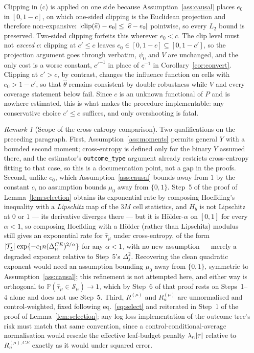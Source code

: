 \documentclass[11pt]{article}
\theoremstyle{plain}
\theoremstyle{definition}
\theoremstyle{remark}
\newtheorem{remark}[theorem]{Remark}
\newcommand{\PP}{\mathbb{P}}
\newcommand{\cT}{\mathcal{T}}
\newcommand{\cS}{\mathcal{S}}
\newcommand{\ez}{e_0}
\newcommand{\mz}{\mu_0}
\newcommand{\ehat}{\widehat{e}}
\newcommand{\that}{\widehat{\tau}}
\newcommand{\thetahat}{\widehat{\theta}}
\DeclarePairedDelimiter{\abs}{\lvert}{\rvert}
\DeclarePairedDelimiter{\card}{\lvert}{\rvert}
\begin{document}
Clipping in (c) is applied on one side
because Assumption~\ref{ass:causal} places $\ez$ in $[0,1-c]$, on which
one-sided clipping is the Euclidean projection and therefore non-expansive:
$\abs{\mathrm{clip}(\ehat)-\ez}\le\abs{\ehat-\ez}$ pointwise, so every $L_2$
bound is preserved. Two-sided clipping forfeits this wherever $\ez<c$. The clip
level must not \emph{exceed} $c$: clipping at $c'\le c$ leaves
$\ez\in[0,1-c]\subseteq[0,1-c']$, so the projection argument goes through
verbatim, $\psi_0$ and $V$ are unchanged, and the only cost is a worse constant,
$c'^{-1}$ in place of $c^{-1}$ in Corollary~\ref{cor:convert}. Clipping at
$c'>c$, by contrast, changes the influence function on cells with $\ez>1-c'$, so
that $\thetahat$ remains consistent by double robustness while $V$ and every
coverage statement below fail. Since $c$ is an unknown functional of $P$ and is
nowhere estimated, this is what makes the procedure implementable: any
conservative choice $c'\le c$ suffices, and only overshooting is fatal.

\begin{remark}[Scope of the cross-entropy comparison]\label{rem:ce-scope}
Two qualifications on the preceding paragraph. First,
Assumption~\ref{ass:moments} permits general $Y$ with a bounded second
moment; cross-entropy is defined only for the binary $Y$ assumed there, and
the estimator's \texttt{outcome\_type} argument already restricts
cross-entropy fitting to that case, so this is a documentation point, not a
gap in the proofs. Second, unlike $\ez$, which Assumption~\ref{ass:causal}
bounds away from $1$ by the constant $c$, no assumption bounds $\mz$ away
from $\{0,1\}$. Step~5 of the proof of Lemma~\ref{lem:selection} obtains its
exponential rate by composing Hoeffding's inequality with a
\emph{Lipschitz} map of the $3M$ cell statistics, and $H_b$ is not
Lipschitz at $0$ or $1$ --- its derivative diverges there --- but it is
H\"older-$\alpha$ on $[0,1]$ for every $\alpha<1$, so composing Hoeffding
with a H\"older (rather than Lipschitz) modulus still gives an exponential
rate for $\that_\mu$ under cross-entropy, of the form
$\card{\cT_{\bar L}}\exp\{-c_1n(\Delta_\mu^{CE})^{2/\alpha}\}$ for any
$\alpha<1$, with no new assumption --- merely a degraded exponent relative
to Step~5's $\Delta_j^2$. Recovering the clean quadratic exponent would need
an assumption bounding $\mz$ away from $\{0,1\}$, symmetric to
Assumption~\ref{ass:causal}; this refinement is not attempted here, and
either way is orthogonal to $\PP(\that_\mu\in\cS_\mu)\to1$, which by Step~6
of that proof rests on Steps~1--4 alone and does not use Step~5. Third,
$R^{(\mu)}$ and $R_n^{(\mu)}$ are unnormalised and control-weighted, fixed
following eq.~\eqref{eq:select} and reiterated in Step~1 of the proof of
Lemma~\ref{lem:selection}; any log-loss implementation of the outcome
tree's risk must match that same convention, since a
control-conditional-average normalisation would rescale the effective
leaf-budget penalty $\lambda_n\card\tau$ relative to $R_n^{(\mu),CE}$
exactly as it would under squared error.
\end{remark}
\end{document}
